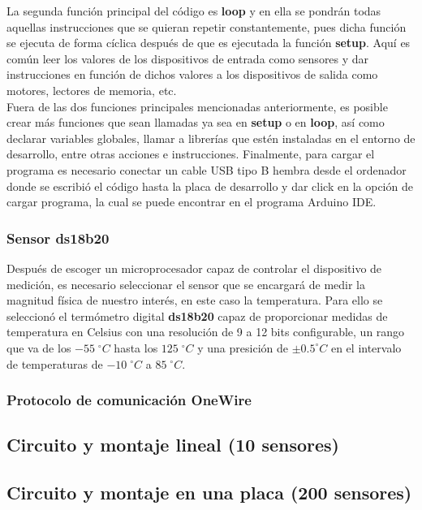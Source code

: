 \documentclass[12pt]{article}
\begin{document}
La segunda función principal del código es \textbf{loop} y en ella se pondrán todas aquellas instrucciones que se quieran repetir constantemente, pues dicha función se ejecuta de forma cíclica después de que es ejecutada la función \textbf{setup}. Aquí es común leer los valores de los dispositivos de entrada como sensores y dar instrucciones en función de dichos valores a los dispositivos de salida como motores, lectores de memoria, etc. \\

Fuera de las dos funciones principales mencionadas anteriormente, es posible crear más funciones que sean llamadas ya sea en \textbf{setup} o en \textbf{loop}, así como declarar variables globales, llamar a librerías que estén instaladas en el entorno de desarrollo, entre otras acciones e instrucciones. Finalmente, para cargar el programa es necesario conectar un cable USB tipo B hembra desde el ordenador donde se escribió el código hasta la placa de desarrollo y dar click en la opción de cargar programa, la cual se puede encontrar en el programa Arduino IDE. \\


\subsubsection{Sensor ds18b20}

Después de escoger un microprocesador capaz de controlar el dispositivo de medición, es necesario seleccionar el sensor que se encargará de medir la magnitud física de nuestro interés, en este caso la temperatura. Para ello se seleccionó el termómetro digital \textbf{ds18b20} capaz de proporcionar medidas de temperatura en Celsius con una resolución de 9 a 12 bits configurable, un rango que va de los $-55 \; ^{\circ}C$ hasta los $125 \; ^{\circ}C$ y una presición de $\pm 0.5 ^{\circ}C$ en el intervalo de temperaturas de $-10 \; ^{\circ}C$ a $85 \; ^{\circ}C$. \\



\subsubsection{Protocolo de comunicación OneWire}


\subsection{Circuito y montaje lineal (10 sensores)}
\subsection{Circuito y montaje en una placa (200 sensores)}
\end{document}
